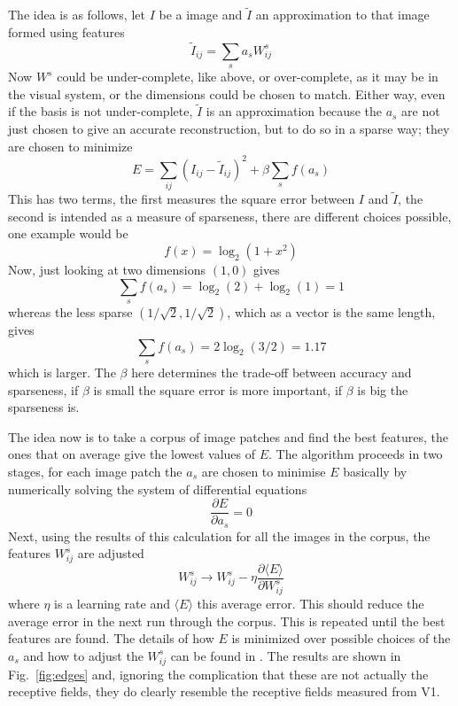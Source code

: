 \documentclass[11pt,a4paper]{scrartcl}
\begin{document}
The idea is as follows, let $I$ be a image and $\tilde{I}$ an approximation to that image formed using features
\begin{equation}
\tilde{I}_{ij}=\sum_{s}a_sW^s_{ij}
\end{equation}
Now $W^s$ could be under-complete, like above, or over-complete, as it
may be in the visual system, or the dimensions could be chosen to match. Either way, even if the basis is not under-complete, $\tilde{I}$ is an approximation because the $a_s$ are not just chosen to give an accurate reconstruction, but to do so in a sparse way; they are chosen to minimize
\begin{equation}
E=\sum_{ij}(I_{ij}-\tilde{I}_{ij})^2+\beta\sum_s f(a_s)
\end{equation}
This has two terms, the first measures the square error between $I$ and $\tilde{I}$, the second is intended as a measure of sparseness, there are different choices possible, one example would be
\begin{equation}
f(x)=\log_2(1+x^2)
\end{equation}
Now, just looking at two dimensions $(1,0)$ gives
\begin{equation}
\sum_sf(a_s)=\log_2{(2)}+\log_2(1)=1
\end{equation}
whereas the less sparse $(1/\sqrt{2},1/\sqrt{2})$, which as a vector
is the same length, gives
\begin{equation}
\sum_sf(a_s)=2\log_2(3/2)=1.17
\end{equation}
which is larger. The $\beta$ here determines the trade-off between
accuracy and sparseness, if $\beta$ is small the square error is more
important, if $\beta$ is big the sparseness is.

The idea now is to take a corpus of image patches and find the best
features, the ones that on average give the lowest values of $E$. The
algorithm proceeds in two stages, for each image patch the $a_s$ are
chosen to minimise $E$ basically by numerically solving the system of differential equations
\begin{equation}
\frac{\partial E}{\partial a_s}=0
\end{equation}
Next, using the results of this calculation for all the images in the
corpus, the features $W^s_{ij}$ are adjusted 
\begin{equation}
W^s_{ij}\rightarrow W^s_{ij}-\eta \frac{\partial \langle E\rangle}{\partial W^s_{ij}}
\end{equation}
where $\eta$ is a learning rate and $\langle E\rangle$ this average
error. This should reduce the average error in the next run through
the corpus. This is repeated until the best features are found. The
details of how $E$ is minimized over possible choices of the $a_s$ and
how to adjust the $W^s_{ij}$ can be found in
\cite{OlshausenField1996a,OlshausenField1997a}. The results are shown
in Fig.~\ref{fig:edges} and, ignoring the complication that these are
not actually the receptive fields, they do clearly resemble the
receptive fields measured from V1.
\end{document}
